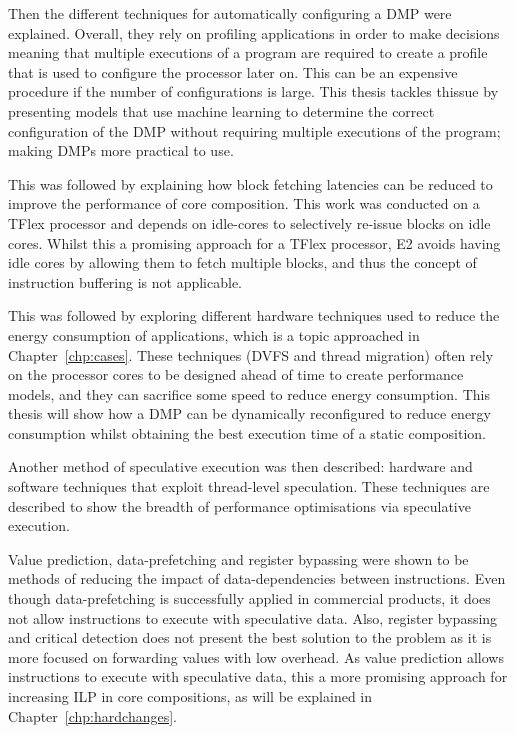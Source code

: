Then the different techniques for automatically configuring a DMP were explained.
Overall, they rely on profiling applications in order to make decisions meaning that multiple executions of a program are required to create a profile that is used to configure the processor later on.
This can be an expensive procedure if the number of configurations is large.
This thesis tackles thissue by presenting models that use machine learning to determine the correct configuration of the DMP without requiring multiple executions of the program; making DMPs more practical to use.

This was followed by explaining how block fetching latencies can be reduced to improve the performance of core composition.
This work was conducted on a TFlex processor and depends on idle-cores to selectively re-issue blocks on idle cores.
Whilst this a promising approach for a TFlex processor, E2 avoids having idle cores by allowing them to fetch multiple blocks, and thus the concept of instruction buffering is not applicable.

This was followed by exploring different hardware techniques used to reduce the energy consumption of applications, which is a topic approached in Chapter~\ref{chp:cases}.
These techniques (DVFS and thread migration) often rely on the processor cores to be designed ahead of time to create performance models, and they can sacrifice some speed to reduce energy consumption.
This thesis will show how a DMP can be dynamically reconfigured to reduce energy consumption whilst obtaining the best execution time of a static composition.

Another method of speculative execution was then described: hardware and software techniques that exploit thread-level speculation.
These techniques are described to show the breadth of performance optimisations via speculative execution.

Value prediction, data-prefetching and register bypassing were shown to be methods of reducing the impact of data-dependencies between instructions.
Even though data-prefetching is successfully applied in commercial products, it does not allow instructions to execute with speculative data.
Also, register bypassing and critical detection does not present the best solution to the problem as it is more focused on forwarding values with low overhead.
As value prediction allows instructions to execute with speculative data, this a more promising approach for increasing ILP in core compositions, as will be explained in Chapter~\ref{chp:hardchanges}.

